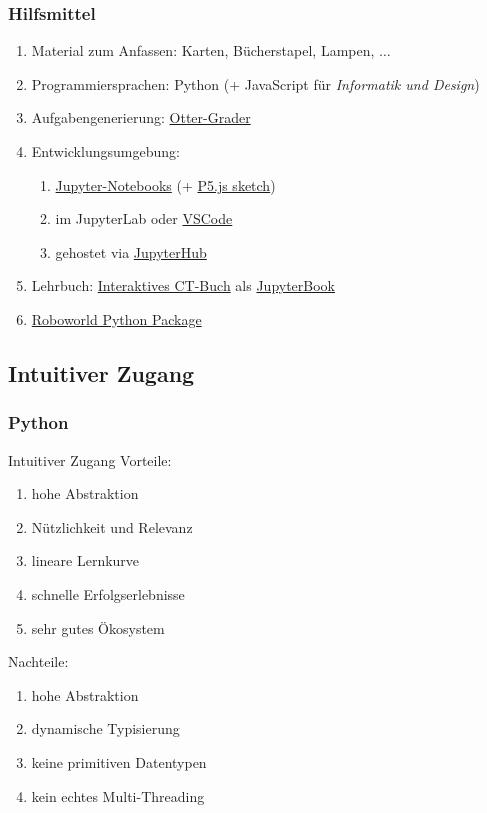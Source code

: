 \documentclass[german,aspectratio=169]{beamer}
\begin{document}
\begin{frame}
	\frametitle{Hilfsmittel}
	\begin{enumerate}[label = $\bullet$]
		\item Material zum Anfassen: Karten, Bücherstapel, Lampen, $\ldots$
		\item Programmiersprachen: Python (+ JavaScript für \textit{Informatik und Design})
		\item Aufgabengenerierung: \href{https://otter-grader.readthedocs.io/en/latest/}{Otter-Grader}
		\item Entwicklungsumgebung: 
		\begin{enumerate}[label = $\bullet$]
			\item \href{https://jupyter.org/}{Jupyter-Notebooks} (+ \href{https://p5js.org/get-started/}{P5.js sketch})
			\item im JupyterLab oder \href{https://code.visualstudio.com/}{VSCode}
			\item gehostet via \href{https://jupyter.org/hub}{JupyterHub}
		\end{enumerate}
		\item Lehrbuch: \href{https://bzoennchen.github.io/ct-book/intro.html}{Interaktives CT-Buch} als \href{https://jupyterbook.org/en/stable/intro.html}{JupyterBook}
		\item \href{https://robo-world-doc.readthedocs.io/en/latest/index.html}{Roboworld Python Package}
	\end{enumerate}
\end{frame}


\subsection{Intuitiver Zugang}

\begin{frame}
	\frametitle{Python}
	\begin{block}{Intuitiver Zugang}
		Vorteile:
		\begin{enumerate}[label = $\bullet$]
			\item hohe Abstraktion
			\item Nützlichkeit und Relevanz
			\item lineare Lernkurve
			\item schnelle Erfolgserlebnisse
			\item sehr gutes Ökosystem
		\end{enumerate}
		Nachteile:
		\begin{enumerate}[label = $\bullet$]
			\item hohe Abstraktion
			\item dynamische Typisierung
			\item keine primitiven Datentypen
			\item kein echtes Multi-Threading
		\end{enumerate}
	\end{block}
\end{frame}
\end{document}
